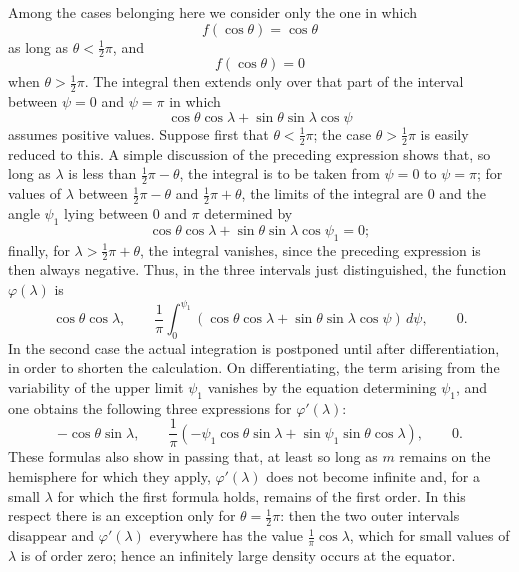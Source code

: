 \documentclass[11pt]{article}
\newcommand{\dd}{\,d}
\begin{document}
Among the cases belonging here we consider only the one in which
\[
 f(\cos\theta)=\cos\theta
\]
as long as $\theta<\frac12\pi$, and
\[
 f(\cos\theta)=0
\]
when $\theta>\frac12\pi$. The integral then extends only over that part of the interval between $\psi=0$ and $\psi=\pi$ in which
\[
 \cos\theta\cos\lambda+\sin\theta\sin\lambda\cos\psi
\]
assumes positive values. Suppose first that $\theta<\frac12\pi$; the case $\theta>\frac12\pi$ is easily reduced to this. A simple discussion of the preceding expression shows that, so long as $\lambda$ is less than $\frac12\pi-\theta$, the integral is to be taken from $\psi=0$ to $\psi=\pi$; for values of $\lambda$ between $\frac12\pi-\theta$ and $\frac12\pi+\theta$, the limits of the integral are $0$ and the angle $\psi_1$ lying between $0$ and $\pi$ determined by
\[
 \cos\theta\cos\lambda+\sin\theta\sin\lambda\cos\psi_1=0;
\]
finally, for $\lambda>\frac12\pi+\theta$, the integral vanishes, since the preceding expression is then always negative. Thus, in the three intervals just distinguished, the function $\varphi(\lambda)$ is
\[
 \cos\theta\cos\lambda,
\qquad
 \frac1\pi\int_0^{\psi_1}(\cos\theta\cos\lambda+\sin\theta\sin\lambda\cos\psi)\dd\psi,
\qquad
 0.
\]
In the second case the actual integration is postponed until after differentiation, in order to shorten the calculation. On differentiating, the term arising from the variability of the upper limit $\psi_1$ vanishes by the equation determining $\psi_1$, and one obtains the following three expressions for $\varphi'(\lambda)$:
\[
 -\cos\theta\sin\lambda,
\qquad
 \frac1\pi(-\psi_1\cos\theta\sin\lambda+\sin\psi_1\sin\theta\cos\lambda),
\qquad
 0.
\]
These formulas also show in passing that, at least so long as $m$ remains on the hemisphere for which they apply, $\varphi'(\lambda)$ does not become infinite and, for a small $\lambda$ for which the first formula holds, remains of the first order. In this respect there is an exception only for $\theta=\frac12\pi$: then the two outer intervals disappear and $\varphi'(\lambda)$ everywhere has the value $\frac1\pi\cos\lambda$, which for small values of $\lambda$ is of order zero; hence an infinitely large density occurs at the equator.
\end{document}
